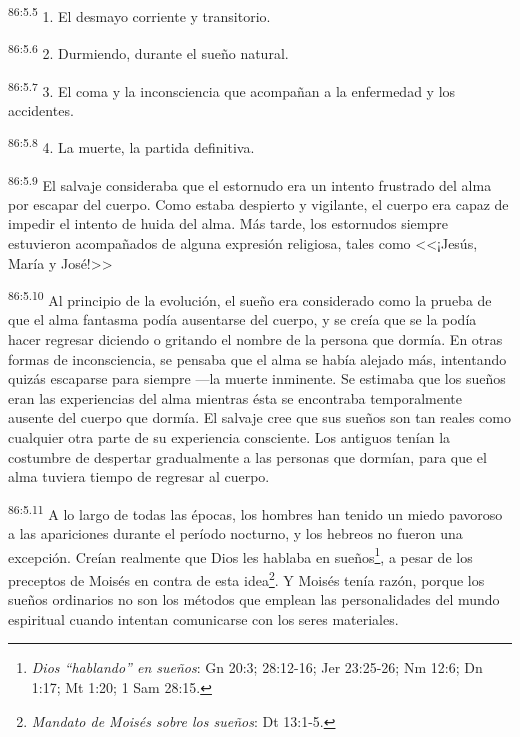 \documentclass[twoside, 11pt]{book}
\begin{document}
\par
\textsuperscript{86:5.5} 1. El desmayo corriente y transitorio.

\par
\textsuperscript{86:5.6} 2. Durmiendo, durante el sueño natural.

\par
\textsuperscript{86:5.7} 3. El coma y la inconsciencia que acompañan a la enfermedad y los accidentes.

\par
\textsuperscript{86:5.8} 4. La muerte, la partida definitiva.

\par
\textsuperscript{86:5.9} El salvaje consideraba que el estornudo era un intento frustrado del alma por escapar del cuerpo. Como estaba despierto y vigilante, el cuerpo era capaz de impedir el intento de huida del alma. Más tarde, los estornudos siempre estuvieron acompañados de alguna expresión religiosa, tales como <<¡Jesús, María y José!>>

\par
\textsuperscript{86:5.10} Al principio de la evolución, el sueño era considerado como la prueba de que el alma fantasma podía ausentarse del cuerpo, y se creía que se la podía hacer regresar diciendo o gritando el nombre de la persona que dormía. En otras formas de inconsciencia, se pensaba que el alma se había alejado más, intentando quizás escaparse para siempre ---la muerte inminente. Se estimaba que los sueños eran las experiencias del alma mientras ésta se encontraba temporalmente ausente del cuerpo que dormía. El salvaje cree que sus sueños son tan reales como cualquier otra parte de su experiencia consciente. Los antiguos tenían la costumbre de despertar gradualmente a las personas que dormían, para que el alma tuviera tiempo de regresar al cuerpo.

\par
\textsuperscript{86:5.11} A lo largo de todas las épocas, los hombres han tenido un miedo pavoroso a las apariciones durante el período nocturno, y los hebreos no fueron una excepción. Creían realmente que Dios les hablaba en sueños\footnote{\textit{Dios ``hablando'' en sueños}: Gn 20:3; 28:12-16; Jer 23:25-26; Nm 12:6; Dn 1:17; Mt 1:20; 1 Sam 28:15.}, a pesar de los preceptos de Moisés en contra de esta idea\footnote{\textit{Mandato de Moisés sobre los sueños}: Dt 13:1-5.}. Y Moisés tenía razón, porque los sueños ordinarios no son los métodos que emplean las personalidades del mundo espiritual cuando intentan comunicarse con los seres materiales.
\end{document}
